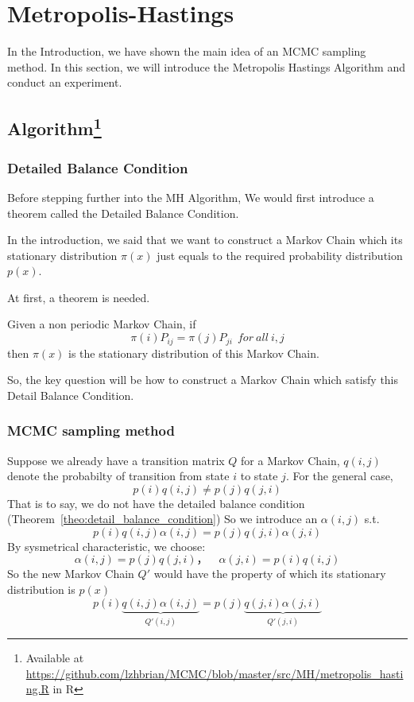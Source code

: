 
\section{Metropolis-Hastings} \label{sec:metropolis_hastings}
In the Introduction, we have shown the main idea of an MCMC sampling method. In this section, we will introduce the Metropolis Hastings Algorithm and conduct an experiment.



\subsection{Algorithm\protect\footnote{Available at \protect\url{https://github.com/lzhbrian/MCMC/blob/master/src/MH/metropolis_hasting.R} in R\cite{R}}}

\subsubsection{Detailed Balance Condition}
Before stepping further into the MH Algorithm, We would first introduce a theorem called the Detailed Balance Condition. 

In the introduction, we said that we want to construct a Markov Chain which its stationary distribution $\pi(x)$ just equals to the required probability distribution $p(x)$.

At first, a theorem is needed.
\begin{theorem} \label{theo:detail_balance_condition}
Given a non periodic Markov Chain, if 
\begin{equation} 
\pi(i) P_{ij} = \pi(j) P_{ji}~~for~all~i,j 
\end{equation}
then $\pi(x)$ is the stationary distribution of this Markov Chain.
\end{theorem}
So, the key question will be how to construct a Markov Chain which satisfy this Detail Balance Condition.

\subsubsection{MCMC sampling method}
Suppose we already have a transition matrix $Q$ for a Markov Chain, $q(i,j)$ denote the probabilty of transition from state $i$ to state $j$. For the general case, 
$$p(i) q(i,j) \neq p(j) q(j,i)$$
That is to say, we do not have the detailed balance condition (Theorem~\ref{theo:detail_balance_condition})
So we introduce an $\alpha(i,j)$ s.t.
\begin{equation} 
p(i) q(i,j)\alpha(i,j) = p(j) q(j,i)\alpha(j,i) 
\end{equation}
By sysmetrical characteristic, we choose:
\begin{equation} 
\alpha(i,j)= p(j) q(j,i)， \quad \alpha(j,i) = p(i) q(i,j)
\end{equation}
So the new Markov Chain $Q'$ would have the property of which its stationary distribution is $p(x)$
\begin{equation}
\label{detailed-balance} 
p(i) \underbrace{q(i,j)\alpha(i,j)}_{Q'(i,j)} 
= p(j) \underbrace{q(j,i)\alpha(j,i)}_{Q'(j,i)}
\end{equation}

